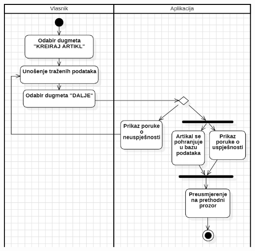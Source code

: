 \documentclass{scrreprt}
\begin{document}
\begin{center}
	\includegraphics[width=14cm]{./img/07.png}
\end{center}

\pagebreak
\end{document}
